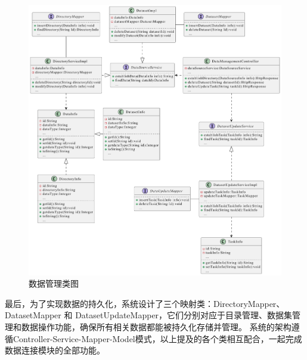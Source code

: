 \begin{figure}[H]
    \centering
    \includegraphics[width=.9\linewidth]{figure/数据管理类图.pdf}
    \caption{数据管理类图}
    \label{fig:datamanageclass}
\end{figure}
最后，为了实现数据的持久化，系统设计了三个映射类：DirectoryMapper、DatasetMapper 和 DatasetUpdateMapper，它们分别对应于目录管理、数据集管理和数据操作功能，确保所有相关数据都能被持久化存储并管理。
系统的架构遵循Controller-Service-Mapper-Model模式，以上提及的各个类相互配合，一起完成数据连接模块的全部功能。
